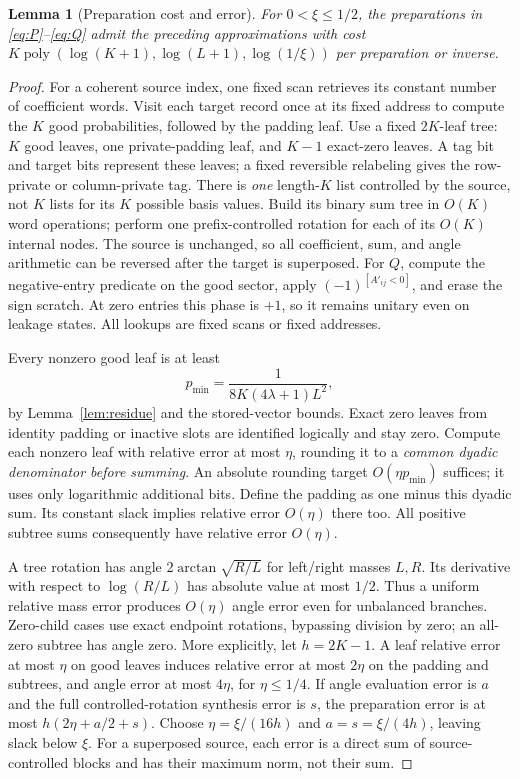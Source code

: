 \documentclass[11pt]{article}
\newtheorem{lemma}[theorem]{Lemma}
\theoremstyle{definition}
\newcommand{\poly}{\operatorname{poly}}
\begin{document}
\begin{lemma}[Preparation cost and error]\label{lem:prep}
For $0<\xi\le1/2$, the preparations in \eqref{eq:P}--\eqref{eq:Q} admit the preceding
approximations with cost
$K\poly(\log(K+1),\log(L+1),\log(1/\xi))$ per preparation or inverse.
\end{lemma}
\begin{proof}
For a coherent source index, one fixed scan retrieves its constant number
of coefficient words. Visit each target record once at its fixed address
to compute the $K$ good probabilities, followed by the padding leaf.
Use a fixed $2K$-leaf tree: $K$ good leaves, one private-padding leaf, and
$K-1$ exact-zero leaves. A tag bit and target bits represent these leaves;
a fixed reversible relabeling gives the row-private or column-private tag.
There is \emph{one} length-$K$ list controlled by the source, not $K$
lists for its $K$ possible basis values. Build its binary sum tree in
$O(K)$ word operations; perform one prefix-controlled rotation for each
of its $O(K)$ internal nodes. The source is unchanged, so all coefficient,
sum, and angle arithmetic can be reversed after the target is superposed.
For $Q$, compute the negative-entry predicate on the good sector, apply
$(-1)^{[A'_{ij}<0]}$, and erase the sign scratch. At zero entries this
phase is $+1$, so it remains unitary even on leakage states.
All lookups are fixed scans or fixed addresses.

Every nonzero good leaf is at least
\[
 p_{\min}=\frac1{8K(4\lambda+1)L^2},
\]
by Lemma~\ref{lem:residue} and the stored-vector bounds. Exact zero leaves
from identity padding or inactive slots are identified logically and stay
zero. Compute each nonzero leaf with relative error at most $\eta$,
rounding it to a \emph{common dyadic denominator before summing}.
An absolute rounding target $O(\eta p_{\min})$ suffices; it uses only
logarithmic additional bits. Define the padding as one minus this dyadic
sum. Its constant slack implies relative error $O(\eta)$ there too.
All positive subtree sums consequently have relative error $O(\eta)$.

A tree rotation has angle $2\arctan\sqrt{R/L}$ for left/right masses
$L,R$. Its derivative with respect to $\log(R/L)$ has absolute value at
most $1/2$. Thus a uniform relative mass error produces $O(\eta)$ angle
error even for unbalanced branches. Zero-child cases use exact endpoint
rotations, bypassing division by zero; an all-zero subtree has angle zero.
More explicitly, let $h=2K-1$. A leaf relative error at most $\eta$ on
good leaves induces relative error at most $2\eta$ on the padding and
subtrees, and angle error at most $4\eta$, for $\eta\le1/4$.
If angle evaluation error is $a$ and the full controlled-rotation synthesis
error is $s$, the preparation error is at most $h(2\eta+a/2+s)$.
Choose $\eta=\xi/(16h)$ and $a=s=\xi/(4h)$, leaving slack below $\xi$.
For a superposed source, each error is a direct sum of
source-controlled blocks and has their maximum norm, not their sum.


\end{proof}
\end{document}
